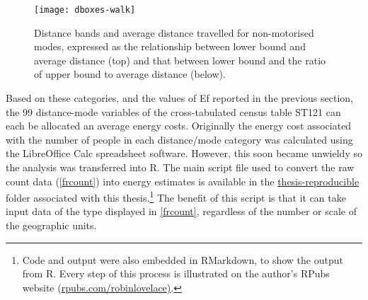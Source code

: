 \begin{figure}[htbp]
\begin{center}
    \texttt{[image: dboxes-walk]}  \end{center}
  \caption[Distance bands and average distance travelled for active modes]
  {Distance bands and average distance travelled for non-motorised modes, expressed
  as the relationship between lower bound and average distance (top)
  and that between lower bound and the ratio of upper bound to average distance
  (below).} %
 \label{fdboxes2}
\end{figure}

% 

Based on these categories, and the values of Ef reported in the previous section,
the 99 distance-mode variables of the cross-tabulated
census table ST121 can each be allocated an average energy
costs.
Originally the energy cost associated with the number of people in
each distance/mode category was calculated using the LibreOffice Calc
spreadsheet software. However, this soon became unwieldy so the analysis
was transferred into R. The main script file used to convert the raw
count data (\cref{frcount}) into energy estimates is available in the
{\color{blue} \href{https://github.com/Robinlovelace/thesis-reproducible}
{thesis-reproducible}} folder associated with this
thesis.\footnote{Code %
and output were also embedded in RMarkdown, to show the output from R.
Every step of this process is illustrated on the author's RPubs website
(\href{http://rpubs.com/RobinLovelace/7178}{rpubs.com/robinlovelace)}.}
The benefit of this script is that it can take input data of the type
displayed in \cref{frcount}, regardless of the number or scale of the
geographic units.


